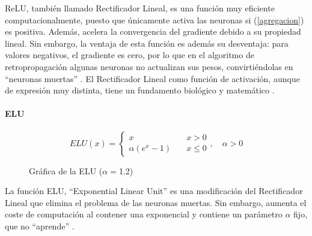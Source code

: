 \documentclass[11pt,twoside,titlepage,a4paper]{article}
\numberwithin{equation}{section} %
\theoremstyle{usual}
\begin{document}
ReLU, también llamado Rectificador Lineal, es una función muy eficiente
computacionalmente, puesto que únicamente activa las neuronas si 
(\ref{agregacion}) es positiva. Además, acelera la convergencia del gradiente
debido a su propiedad lineal. Sin embargo, la ventaja de esta función es
además su desventaja: para valores negativos, el gradiente es cero, por lo
que en el algoritmo de retropropagación algunas neuronas no actualizan sus
pesos, convirtiéndolas en ``neuronas muertas'' \cite{activation}. El 
Rectificador Lineal como función de activación, aunque de expresión muy 
distinta, tiene un fundamento biológico y matemático \cite{relu}.\\

\paragraph{ELU}
\begin{equation}
    ELU(x)=\begin{cases}
        x & \quad x>0 \\
        \alpha(e^x-1) & \quad x\leq 0 
    \end{cases},\quad\alpha>0
\end{equation}

\begin{figure}[!h]
    \centering
    \caption{Gráfica de la ELU ($\alpha=$1.2)}
\end{figure}

La función ELU, ``Exponential Linear Unit'' es una modificación del
Rectificador Lineal que elimina el problema de las neuronas muertas. Sin
embargo, aumenta el coste de computación al contener una exponencial y contiene
un parámetro $\alpha$ fijo, que no ``aprende'' \cite{activation}.\\
\end{document}
